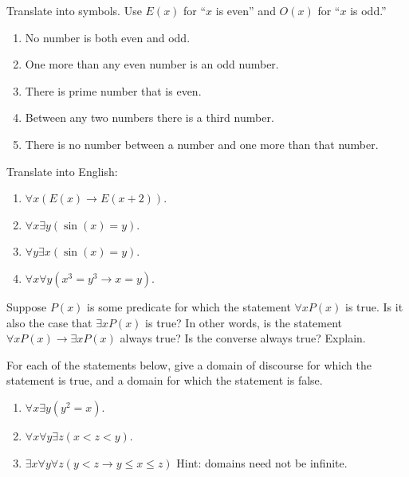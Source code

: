 \documentclass[10pt,]{book}
\theoremstyle{plain}
\theoremstyle{definition}
\theoremstyle{definition}
\theoremstyle{definition}
\theoremstyle{definition}
\numberwithin{equation}{chapter}
\def\imp{\rightarrow}
\newcommand{\lt}{<}
\begin{document}
\begin{divisionexercise}{7}\hypertarget{exercise-183}{}
\hypertarget{p-1415}{}%
Translate into symbols. Use \(E(x)\) for ``\(x\) is even'' and \(O(x)\) for ``\(x\) is odd.''%
\leavevmode%
\begin{enumerate}[label=(\alph*)]
\item\hypertarget{li-381}{}\hypertarget{p-1416}{}%
No number is both even and odd.%
\item\hypertarget{li-382}{}\hypertarget{p-1417}{}%
One more than any even number is an odd number.%
\item\hypertarget{li-383}{}\hypertarget{p-1418}{}%
There is prime number that is even.%
\item\hypertarget{li-384}{}\hypertarget{p-1419}{}%
Between any two numbers there is a third number.%
\item\hypertarget{li-385}{}\hypertarget{p-1420}{}%
There is no number between a number and one more than that number.%
\end{enumerate}
\end{divisionexercise}%
\begin{divisionexercise}{8}\hypertarget{exercise-184}{}
\hypertarget{p-1422}{}%
Translate into English: \leavevmode%
\begin{enumerate}[label=(\alph*)]
\item\hypertarget{li-391}{}\(\forall x (E(x) \imp E(x +2))\).%
\item\hypertarget{li-392}{}\(\forall x \exists y (\sin(x) = y)\).%
\item\hypertarget{li-393}{}\(\forall y \exists x (\sin(x) = y)\).%
\item\hypertarget{li-394}{}\(\forall x \forall y (x^3 = y^3 \imp x = y)\).%
\end{enumerate}
%
\end{divisionexercise}%
\begin{divisionexercise}{9}\hypertarget{exercise-185}{}
\hypertarget{p-1428}{}%
Suppose \(P(x)\) is some predicate for which the statement \(\forall x P(x)\) is true. Is it also the case that \(\exists x P(x)\) is true? In other words, is the statement \(\forall x P(x) \imp \exists x P(x)\) always true? Is the converse always true? Explain.%
\end{divisionexercise}%
\begin{divisionexercise}{10}\hypertarget{exercise-186}{}
\hypertarget{p-1429}{}%
For each of the statements below, give a domain of discourse for which the statement is true, and a domain for which the statement is false.%
\par
\hypertarget{p-1430}{}%
\leavevmode%
\begin{enumerate}[label=(\alph*)]
\item\hypertarget{li-399}{}\(\forall x \exists y (y^2 = x)\).%
\item\hypertarget{li-400}{}\(\forall x \forall y \exists z (x \lt  z \lt  y)\).%
\item\hypertarget{li-401}{}\(\exists x \forall y \forall z (y \lt  z \imp y \le x \le z)\) Hint: domains need not be infinite.%
\end{enumerate}
%
\end{divisionexercise}%
\end{document}

